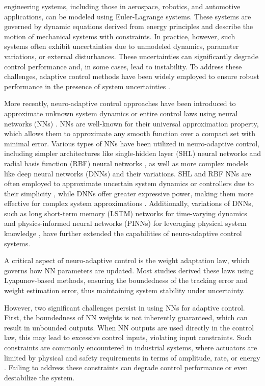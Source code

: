 \documentclass[lettersize,journal]{IEEEtran}
\begin{document}
 engineering systems, including those in aerospace, robotics, and automotive applications, can be modeled using Euler-Lagrange systems. 
These systems are governed by dynamic equations derived from energy principles and describe the motion of mechanical systems with constraints. 
In practice, however, such systems often exhibit uncertainties due to unmodeled dynamics, parameter variations, or external disturbances. 
These uncertainties can significantly degrade control performance and, in some cases, lead to instability. 
To address these challenges, adaptive control methods have been widely employed to ensure robust performance in the presence of system uncertainties \cite{Ioannou:2006aa, Tao:2003aa}.

More recently, neuro-adaptive control approaches have been introduced to approximate unknown system dynamics or entire control laws using neural networks (NNs) \cite{Farrell:2006aa}. 
NNs are well-known for their universal approximation property, which allows them to approximate any smooth function over a compact set with minimal error. 
Various types of NNs have been utilized in neuro-adaptive control, including simpler architectures like single-hidden layer (SHL) neural networks \cite{Ge:2010aa, Yesildirek:1995aa} and radial basis function (RBF) neural networks \cite{Liu:2013ab,Ge:2002aa}, as well as more complex models like deep neural networks (DNNs) \cite{Patil:2022aa} and their variations. 
SHL and RBF NNs are often employed to approximate uncertain system dynamics or controllers due to their simplicity \cite{Esfandiari:2014aa,Esfandiari:2015aa,Yesildirek:1995aa,Gao:2006aa}, while DNNs offer greater expressive power, making them more effective for complex system approximations \cite{Rolnick:2018aa}. 
Additionally, variations of DNNs, such as long short-term memory (LSTM) networks for time-varying dynamics \cite{Liu:2013ab} and physics-informed neural networks (PINNs) for leveraging physical system knowledge \cite{Hart:2024aa}, have further extended the capabilities of neuro-adaptive control systems.

A critical aspect of neuro-adaptive control is the weight adaptation law, which governs how NN parameters are updated. 
Most studies derived these laws using Lyapunov-based methods, ensuring the boundedness of the tracking error and weight estimation error, thus maintaining system stability under uncertainty.

However, two significant challenges persist in using NNs for adaptive control. 
First, the boundedness of NN weights is not inherently guaranteed, which can result in unbounded outputs. 
When NN outputs are used directly in the control law, this may lead to excessive control inputs, violating input constraints. 
Such constraints are commonly encountered in industrial systems, where actuators are limited by physical and safety requirements in terms of amplitude, rate, or energy \cite{Esfandiari:2021aa}. 
Failing to address these constraints can degrade control performance or even destabilize the system.
\end{document}

